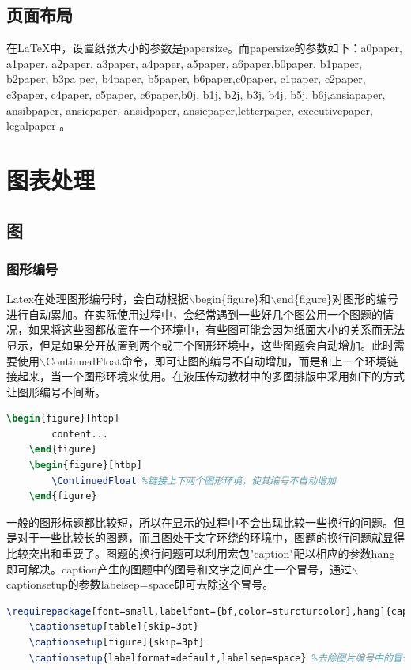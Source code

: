 \documentclass[12pt]{book}
\begin{document}
\section{页面布局}

在\LaTeX{}中，设置纸张大小的参数是papersize。而papersize的参数如下：a0paper, a1paper, a2paper, a3paper, a4paper, a5paper, a6paper,b0paper, b1paper, b2paper, b3pa per, b4paper, b5paper, b6paper,c0paper, c1paper, c2paper, c3paper, c4paper, c5paper, c6paper,b0j, b1j, b2j, b3j, b4j, b5j, b6j,ansiapaper, ansibpaper, ansicpaper, ansidpaper, ansiepaper,letterpaper, executivepaper, legalpaper 。

\chapter{图表处理}

\section{图}

\subsection{图形编号}

Latex在处理图形编号时，会自动根据$\backslash$begin\{figure\}和$\backslash$end\{figure\}对图形的编号进行自动累加。在实际使用过程中，会经常遇到一些好几个图公用一个图题的情况，如果将这些图都放置在一个环境中，有些图可能会因为纸面大小的关系而无法显示，但是如果分开放置到两个或三个图形环境中，这些图题会自动增加。此时需要使用$\backslash$ContinuedFloat命令，即可让图的编号不自动增加，而是和上一个环境链接起来，当一个图形环境来使用。在液压传动教材中的多图排版中采用如下的方式让图形编号不间断。
\begin{lstlisting}[language=tex,breaklines]
	\begin{figure}[htbp]
		content...
	\end{figure}	
	\begin{figure}[htbp]
		\ContinuedFloat %链接上下两个图形环境，使其编号不自动增加
	\end{figure}
\end{lstlisting}

一般的图形标题都比较短，所以在显示的过程中不会出现比较一些换行的问题。但是对于一些比较长的图题，而且图处于文字环绕的环境中，图题的换行问题就显得比较突出和重要了。图题的换行问题可以利用宏包"caption"配以相应的参数hang即可解决。caption产生的图题中的图号和文字之间产生一个冒号，通过$\backslash$captionsetup的参数labelsep=space即可去除这个冒号。
\begin{lstlisting}[language=tex,breaklines]
	\requirepackage[font=small,labelfont={bf,color=sturcturcolor},hang]{caption} %hang解决了图题过长时的自动换行问题
	\captionsetup[table]{skip=3pt}
	\captionsetup[figure]{skip=3pt}
	\captionsetup{labelformat=default,labelsep=space} %去除图片编号中的冒号
\end{lstlisting}
\end{document}
